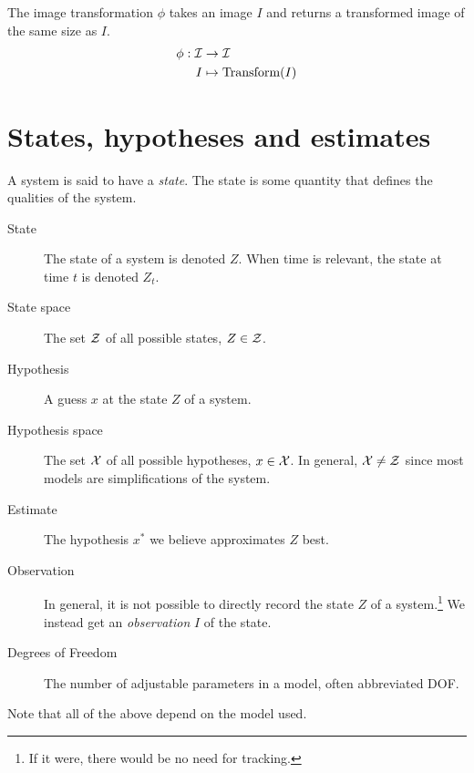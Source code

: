 \begin{definition}
    The image transformation $\phi$ takes an image $I$ and returns a transformed image of the same size as $I$.
    \begin{equation}
        \begin{split}
            \phi : \mathcal{I} &\rightarrow \mathcal{I}\\
                I &\mapsto \text{Transform}(I)
        \end{split}
    \end{equation}
\end{definition}

\section{States, hypotheses and estimates}
A system is said to have a \emph{state}. The state is some quantity that defines the qualities of the system.

\begin{description}
\item[State] The state of a system is denoted $Z$. When time is relevant, the state at time $t$ is denoted $Z_t$.
\item[State space] The set $\mathcal{Z}$ of all possible states, $Z \in \mathcal{Z}$.
\item[Hypothesis] A guess $x$ at the state $Z$ of a system.
\item[Hypothesis space] The set $\mathcal{X}$ of all possible hypotheses, $x \in \mathcal{X}$. In general, $\mathcal{X} \neq \mathcal{Z}$ since most models are simplifications of the system.
\item[Estimate] The hypothesis $x^*$ we believe approximates $Z$ best.
\item[Observation]
In general, it is not possible to directly record the state $Z$ of a system.\footnote{If it were, there would be no need for tracking.} We instead get an \emph{observation} $I$ of the state.
\item[Degrees of Freedom] The number of adjustable parameters in a model, often abbreviated DOF.
\end{description}

Note that all of the above depend on the  model used.

%

